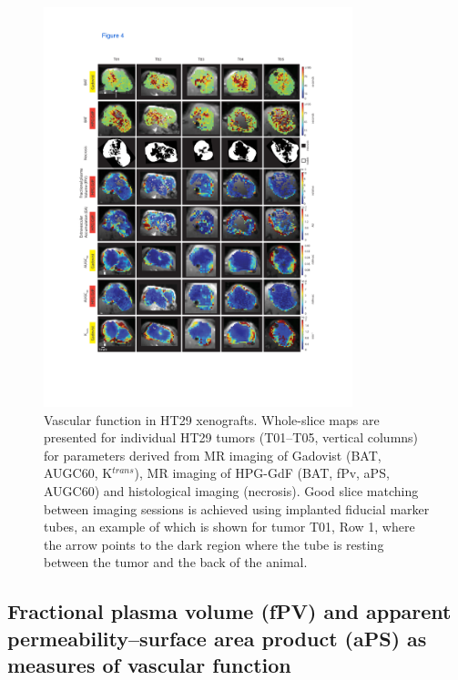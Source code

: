 \begin{figure}[htbp]   
 \begin{center}  
 \includegraphics[width=0.8\textwidth]{hpg/hpg-images/hpg_fig4-ht29.pdf}
 \caption{Vascular function in HT29 xenografts. Whole-slice maps are presented for individual HT29 tumors (T01–T05, vertical columns) for parameters derived from MR imaging of Gadovist (BAT, AUGC60, K$^{trans}$), MR imaging of HPG-GdF (BAT, fPv, aPS, AUGC60) and histological imaging (necrosis). Good slice matching between imaging sessions is achieved using implanted fiducial marker tubes, an example of which is shown for tumor T01, Row 1, where the arrow points to the dark region where the tube is resting between the tumor and the back of the animal.}  
 \label{hpgpaper:fig4}  
 \end{center}
\end{figure}

\subsection{Fractional plasma volume (fPV) and apparent permeability–surface area product (aPS) as measures of vascular function}


